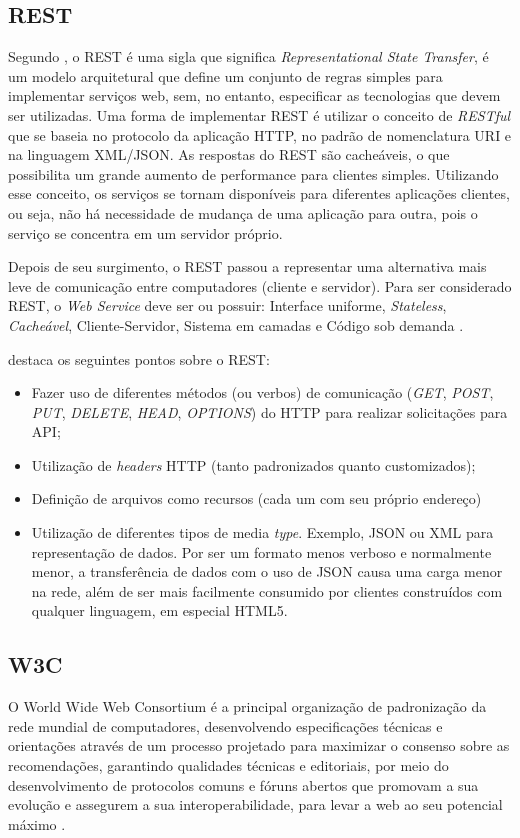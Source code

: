 \newpage
\subsection{REST}
Segundo , o REST é uma sigla que significa \textit{Representational State Transfer}, é um modelo arquitetural que define um conjunto de regras simples para implementar serviços web, sem, no entanto, especificar as tecnologias que devem ser utilizadas. Uma forma de implementar REST é utilizar o conceito de \textit{RESTful} que se baseia no protocolo da aplicação HTTP, no padrão de nomenclatura URI e na linguagem XML/JSON. As respostas do REST são cacheáveis, o que possibilita um grande aumento de performance para clientes simples. Utilizando esse conceito, os serviços se tornam disponíveis para diferentes aplicações clientes, ou seja, não há necessidade de mudança de uma aplicação para outra, pois o serviço se concentra em um servidor próprio. 

Depois de seu surgimento, o REST passou a representar uma alternativa mais leve de comunicação entre computadores (cliente e servidor). Para ser considerado REST, o \textit{Web Service} deve ser ou possuir: Interface uniforme, \textit{Stateless}, \textit{Cacheável}, Cliente-Servidor, Sistema em camadas e Código sob demanda \cite{rest:roy}. 

 destaca os seguintes pontos sobre o REST:
\begin{itemize}
    \item Fazer uso de diferentes métodos (ou verbos) de comunicação (\textit{GET}, \textit{POST}, \textit{PUT}, \textit{DELETE}, \textit{HEAD}, \textit{OPTIONS}) do HTTP para realizar solicitações para API; 
    \item Utilização de \textit{headers} HTTP (tanto padronizados quanto customizados); 
    \item Definição de arquivos como recursos (cada um com seu próprio endereço)
    \item Utilização de diferentes tipos de media \textit{type}. Exemplo, JSON ou XML para representação de dados. Por ser um formato menos verboso e normalmente menor, a transferência de dados com o uso de JSON causa uma carga menor na rede, além de ser mais facilmente consumido por clientes construídos com qualquer linguagem, em especial HTML5.
\end{itemize}

\subsection{W3C}
O World Wide Web Consortium é a principal organização de padronização da rede mundial de computadores, desenvolvendo especificações técnicas e orientações através de um processo projetado para maximizar o consenso sobre as recomendações, garantindo qualidades técnicas e editoriais, por meio do desenvolvimento de protocolos comuns e fóruns abertos que promovam a sua evolução e assegurem a sua interoperabilidade, para levar a web ao seu potencial máximo \cite{api:w3c}.

